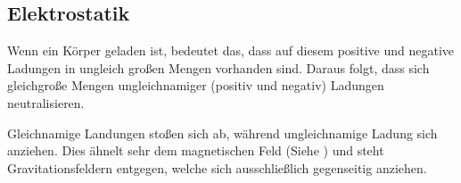 




%
%	





\subsection{Elektrostatik}

Wenn ein Körper geladen ist, bedeutet das, dass auf diesem positive und negative Ladungen in ungleich großen Mengen vorhanden sind. Daraus folgt, dass sich gleichgroße Mengen ungleichnamiger (positiv und negativ) Ladungen neutralisieren.

Gleichnamige Landungen stoßen sich ab, während ungleichnamige Ladung sich anziehen. Dies ähnelt sehr dem magnetischen Feld (Siehe ) und steht Gravitationsfeldern entgegen, welche sich ausschließlich gegenseitig anziehen.

